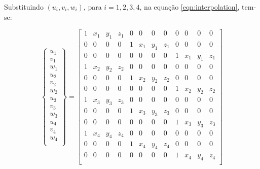 Substituindo $(u_{i}, v_{i}, w_{i})$, para $i = {1, 2, 3, 4}$, na equação \ref{eqn:interpolation}, tem-se:

\begin{equation} \label{eq:matrixdisplacement}
    \begin{Bmatrix}
        u_{1} \\
        v_{1} \\
        w_{1} \\
        u_{2} \\
        v_{2} \\
        w_{2} \\
        u_{3} \\
        v_{3} \\
        w_{3} \\
        u_{4} \\
        v_{4} \\
        w_{4} \\
    \end{Bmatrix}
    = 
    \begin{bmatrix}
    1 & x_{1} & y_{1} & z_{1} & 0 & 0 & 0 & 0 & 0 & 0 & 0 & 0 \\
    0 & 0 & 0 & 0 &  1 & x_{1} & y_{1} & z_{1} & 0 & 0 & 0 & 0 \\
    0 & 0 & 0 & 0 & 0 & 0 & 0 & 0 & 1 & x_{1} & y_{1} & z_{1} \\

    1 & x_{2} & y_{2} & z_{2} & 0 & 0 & 0 & 0 & 0 & 0 & 0 & 0 \\
    0 & 0 & 0 & 0 &  1 & x_{2} & y_{2} & z_{2} & 0 & 0 & 0 & 0 \\
    0 & 0 & 0 & 0 & 0 & 0 & 0 & 0 & 1 & x_{2} & y_{2} & z_{2} \\
    
    1 & x_{3} & y_{3} & z_{3} & 0 & 0 & 0 & 0 & 0 & 0 & 0 & 0 \\
    0 & 0 & 0 & 0 &  1 & x_{3} & y_{3} & z_{3} & 0 & 0 & 0 & 0 \\
    0 & 0 & 0 & 0 & 0 & 0 & 0 & 0 & 1 & x_{3} & y_{3} & z_{3} \\
    
    1 & x_{4} & y_{4} & z_{4} & 0 & 0 & 0 & 0 & 0 & 0 & 0 & 0 \\
    0 & 0 & 0 & 0 &  1 & x_{4} & y_{4} & z_{4} & 0 & 0 & 0 & 0 \\
    0 & 0 & 0 & 0 & 0 & 0 & 0 & 0 & 1 & x_{4} & y_{4} & z_{4} \\


\end{bmatrix}
\end{equation}

